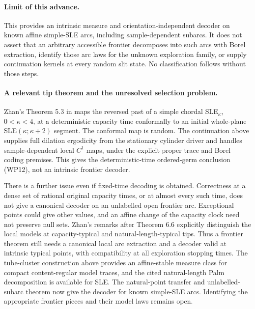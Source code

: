\documentclass[11pt]{article}
\theoremstyle{definition}\newtheorem{definition}[theorem]{Definition}
\theoremstyle{remark}\newtheorem{remark}[theorem]{Remark}
\begin{document}
\paragraph{Limit of this advance.}
This provides an intrinsic measure and orientation-independent decoder
on known affine simple-SLE arcs, including sample-dependent subarcs.
It does not assert that an arbitrary accessible frontier decomposes
into such arcs with Borel extraction, identify those arc laws for
the unknown exploration family, or supply continuation kernels at
every random slit state. No classification follows without those steps.


\paragraph{A relevant tip theorem and the unresolved selection problem.}
Zhan's Theorem 5.3 in \cite{zhan-tip} maps the reversed past of a
simple chordal SLE$_\kappa$, $0<\kappa<4$, at a deterministic
capacity time conformally to an initial whole-plane
SLE$(\kappa;\kappa+2)$ segment. The conformal map is random.
The continuation above supplies full dilation ergodicity from the
stationary cylinder driver and handles sample-dependent local $C^1$ maps,
under the explicit proper trace and Borel coding premises. This gives
the deterministic-time ordered-germ conclusion (WP12), not an intrinsic
frontier decoder.

There is a further issue even if fixed-time decoding is obtained.
Correctness at a dense set of rational original capacity times, or
at almost every such time, does not give a canonical decoder on an
unlabelled open frontier arc. Exceptional points could give other
values, and an affine change of the capacity clock need not preserve
null sets. Zhan's remarks after Theorem 6.6 explicitly distinguish
the local models at capacity-typical and natural-length-typical tips.
Thus a frontier theorem still needs a canonical local arc extraction
and a decoder valid at intrinsic typical points, with compatibility at
all exploration stopping times. The tube-cluster construction above
provides an affine-stable measure class for compact content-regular
model traces, and the cited natural-length Palm decomposition is
available for SLE. The natural-point transfer and unlabelled-subarc theorem now give
the decoder for known simple-SLE arcs. Identifying the appropriate
frontier pieces and their model laws remains open.


\end{document}
